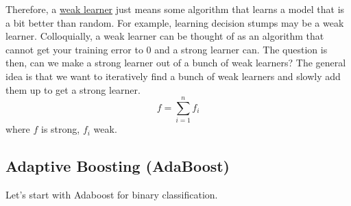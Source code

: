   Therefore, a \hyperref[def:weak-learner]{weak learner} just means some algorithm that learns a model that is a bit better than random. For example, learning decision stumps may be a weak learner. Colloquially, a weak learner can be thought of as an algorithm that cannot get your training error to $0$ and a strong learner can. The question is then, can we make a strong learner out of a bunch of weak learners? The general idea is that we want to iteratively find a bunch of weak learners and slowly add them up to get a strong learner. 
  \begin{equation}
    f = \sum_{i=1}^n f_i
  \end{equation}
  where $f$ is strong, $f_i$ weak. 

\subsection{Adaptive Boosting (AdaBoost)} 

  Let's start with Adaboost for binary classification. 

